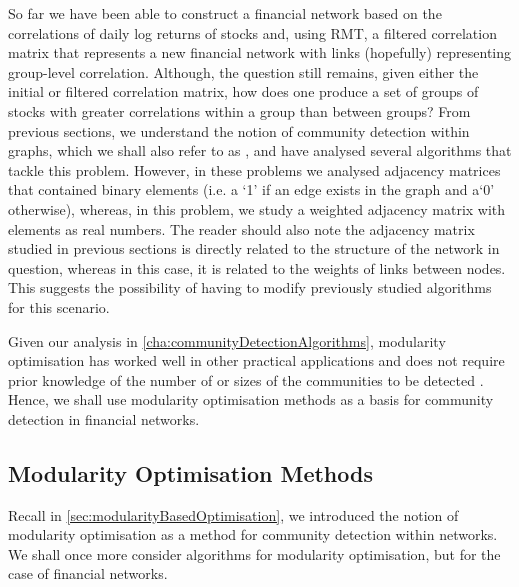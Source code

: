 So far we have been able to construct a financial network based on the correlations of daily log returns of stocks and, using RMT, a filtered correlation matrix that represents a new financial network with links (hopefully) representing group-level correlation.
Although, the question still remains, given either the initial or filtered correlation matrix, how does one produce a set of groups of stocks with greater correlations within a group than between groups?
From previous sections, we understand the notion of community detection within graphs, which we shall also refer to as , and have analysed several algorithms that tackle this problem. However, in these problems we analysed adjacency matrices that contained binary elements (i.e. a `1' if an edge exists in the graph and a`0' otherwise), whereas, in this problem, we study a weighted adjacency matrix with elements as real numbers.
The reader should also note the adjacency matrix studied in previous sections is directly related to the structure of the network in question, whereas in this case, it is related to the weights of links between nodes.
This suggests the possibility of having to modify previously studied algorithms for this scenario.

Given our analysis in \cref{cha:communityDetectionAlgorithms}, modularity optimisation has worked well in other practical applications and does not require prior knowledge of the number of or sizes of the communities to be detected \cite{HGH+12,MG13}.
Hence, we shall use modularity optimisation methods as a basis for community detection in financial networks.


\subsection{Modularity Optimisation Methods}
\label{subsec:modularityOptimisationMethods}

Recall in \cref{sec:modularityBasedOptimisation}, we introduced the notion of modularity optimisation as a method for community detection within networks. We shall once more consider algorithms for modularity optimisation, but for the case of financial networks.

